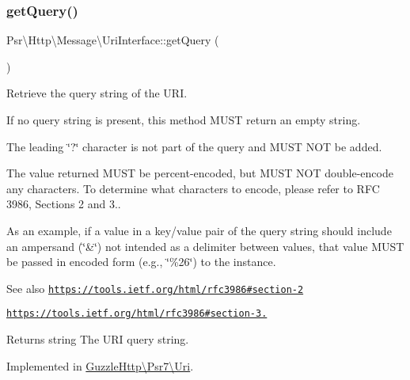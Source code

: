 \subsubsection{\texorpdfstring{get\+Query()}{getQuery()}}
{\footnotesize\ttfamily Psr\textbackslash{}\+Http\textbackslash{}\+Message\textbackslash{}\+Uri\+Interface\+::get\+Query (\begin{DoxyParamCaption}{ }\end{DoxyParamCaption})}

Retrieve the query string of the U\+RI.

If no query string is present, this method M\+U\+ST return an empty string.

The leading \char`\"{}?\char`\"{} character is not part of the query and M\+U\+ST N\+OT be added.

The value returned M\+U\+ST be percent-\/encoded, but M\+U\+ST N\+OT double-\/encode any characters. To determine what characters to encode, please refer to R\+FC 3986, Sections 2 and 3..

As an example, if a value in a key/value pair of the query string should include an ampersand (\char`\"{}\&\char`\"{}) not intended as a delimiter between values, that value M\+U\+ST be passed in encoded form (e.\+g., \char`\"{}\%26\char`\"{}) to the instance.

\begin{DoxySeeAlso}{See also}
\href{https://tools.ietf.org/html/rfc3986#section-2}{\tt https\+://tools.\+ietf.\+org/html/rfc3986\#section-\/2} 

\href{https://tools.ietf.org/html/rfc3986#section-3.4}{\tt https\+://tools.\+ietf.\+org/html/rfc3986\#section-\/3.} 
\end{DoxySeeAlso}
\begin{DoxyReturn}{Returns}
string The U\+RI query string. 
\end{DoxyReturn}


Implemented in \hyperlink{classGuzzleHttp_1_1Psr7_1_1Uri_a67650b5b4d619cb30e2951da11d0f369}{Guzzle\+Http\textbackslash{}\+Psr7\textbackslash{}\+Uri}.

\mbox{\label{interfacePsr_1_1Http_1_1Message_1_1UriInterface_a12b7d87a6b448aaf0cb4978029dc5ecc}} 

